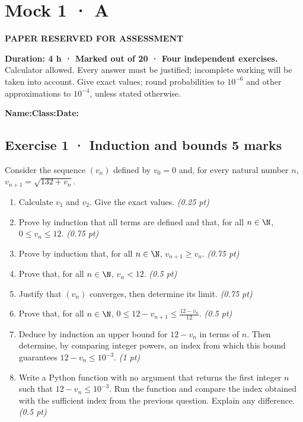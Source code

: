 \fi

\ifprof

\clearpage{}\label{sujet:5-3}

\section*{Mock 1 · A}

{\sffamily\bfseries\color{amber}PAPER RESERVED FOR ASSESSMENT\par}

\textbf{Duration: 4 h · Marked out of 20 · Four independent exercises.}\\Calculator allowed. Every answer must be justified; incomplete working will be taken into account. Give exact values; round probabilities to $10^{-6}$ and other approximations to $10^{-4}$, unless stated otherwise.

\smallskip\textbf{Name:}\enspace\dotfill\quad\textbf{Class:}\enspace\dotfill\quad\textbf{Date:}\enspace\dotfill

\subsection*{Exercise 1 · Induction and bounds \hfill 5 marks}Consider the sequence $(v_n)$ defined by $v_0=0$ and, for every natural number $n$, $v_{n+1}=\sqrt{132+v_n}$.

\begin{enumerate}

\item Calculate $v_1$ and $v_2$. Give the exact values. \hfill\textit{(0.25 pt)}

\item Prove by induction that all terms are defined and that, for all $n\in\N$, $0\le v_n\le12$. \hfill\textit{(0.75 pt)}

\item Prove by induction that, for all $n\in\N$, $v_{n+1}\ge v_n$. \hfill\textit{(0.75 pt)}

\item Prove that, for all $n\in\N$, $v_n<12$. \hfill\textit{(0.5 pt)}

\item Justify that $(v_n)$ converges, then determine its limit. \hfill\textit{(0.75 pt)}

\item Prove that, for all $n\in\N$, $0\le 12-v_{n+1}\le\frac{12-v_n}{12}$. \hfill\textit{(0.5 pt)}

\item Deduce by induction an upper bound for $12-v_n$ in terms of $n$. Then determine, by comparing integer powers, an index from which this bound guarantees $12-v_n\le10^{-3}$. \hfill\textit{(1 pt)}

\item Write a Python function with no argument that returns the first integer $n$ such that $12-v_n\le10^{-3}$. Run the function and compare the index obtained with the sufficient index from the previous question. Explain any difference. \hfill\textit{(0.5 pt)}

\end{enumerate}

